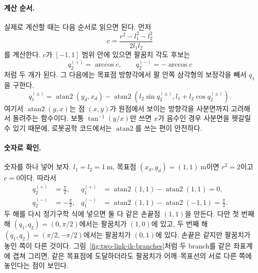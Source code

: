 \paragraph{계산 순서.}
%
실제로 계산할 때는 다음 순서로 읽으면 된다.
먼저
\begin{equation}
  c
  =
  \frac{r^2-l_1^2-l_2^2}{2l_1l_2}
  \label{eq:two-link-ik-c-value}
\end{equation}
를 계산한다.
\(c\)가 \([-1,1]\) 범위 안에 있으면 팔꿈치 각도 후보는
\begin{equation}
  q_2^{(+)}
  =
  \arccos c,
  \qquad
  q_2^{(-)}
  =
  -\arccos c
  \label{eq:two-link-ik-q2-branches}
\end{equation}
처럼 두 개가 된다.
그 다음에는 목표점 방향각에서 팔 안쪽 삼각형의 보정각을 빼서 \(q_1\)을 구한다.
\begin{equation}
  q_1^{(\pm)}
  =
  \operatorname{atan2}(y_d,x_d)
  -
  \operatorname{atan2}
  \left(
    l_2\sin q_2^{(\pm)},
    l_1+l_2\cos q_2^{(\pm)}
  \right).
  \label{eq:two-link-ik-q1-from-q2}
\end{equation}
여기서 \(\operatorname{atan2}(y,x)\)는 점 \((x,y)\)가 원점에서 보이는 방향각을 사분면까지 고려해서 돌려주는 함수이다.
보통 \(\tan^{-1}(y/x)\)만 쓰면 \(x\)가 음수인 경우 사분면을 헷갈릴 수 있기 때문에, 로봇공학 코드에서는 \(\operatorname{atan2}\)를 쓰는 편이 안전하다.

\paragraph{숫자로 확인.}
%
숫자를 하나 넣어 보자.
\(l_1=l_2=1~\mathrm{m}\), 목표점 \((x_d,y_d)=(1,1)~\mathrm{m}\)이면 \(r^2=2\)이고 \(c=0\)이다.
따라서
\begin{align}
  q_2^{(+)}
  &=
  \frac{\pi}{2},
  &
  q_1^{(+)}
  &=
  \operatorname{atan2}(1,1)
  -
  \operatorname{atan2}(1,1)
  =
  0,
  \label{eq:two-link-ik-positive-branch}
  \\
  q_2^{(-)}
  &=
  -\frac{\pi}{2},
  &
  q_1^{(-)}
  &=
  \operatorname{atan2}(1,1)
  -
  \operatorname{atan2}(-1,1)
  =
  \frac{\pi}{2}.
  \label{eq:two-link-ik-negative-branch}
\end{align}
두 해를 다시 정기구학 식에 넣으면 둘 다 같은 손끝점 \((1,1)\)을 만든다.
다만 첫 번째 해 \((q_1,q_2)=(0,\pi/2)\)에서는 팔꿈치가 \((1,0)\)에 있고, 두 번째 해 \((q_1,q_2)=(\pi/2,-\pi/2)\)에서는 팔꿈치가 \((0,1)\)에 있다.
손끝은 같지만 팔꿈치가 놓인 쪽이 다른 것이다.
그림~\ref{fig:two-link-ik-branches}처럼 두 branch를 같은 좌표계에 겹쳐 그리면, 같은 목표점에 도달하더라도 팔꿈치가 어깨--목표선의 서로 다른 쪽에 놓인다는 점이 보인다.

